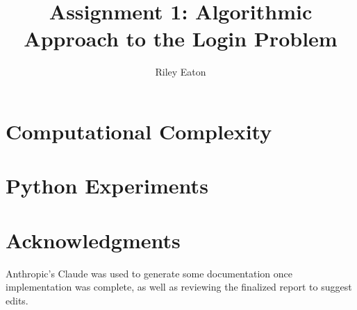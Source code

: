 \documentclass[acmsmall,screen]{acmart}
\title{Assignment 1: Algorithmic Approach to the Login Problem}
\author{Riley Eaton}
\affiliation{%
  \institution{University of British Columbia}
  \city{Kelowna}
  \state{BC}
  \country{Canada}
}
\begin{document}
\fancyfoot{} %

\maketitle

\section{Computational Complexity} \label{sec:complexity}


\section{Python Experiments} \label{sec:experiments}







\section*{Acknowledgments}
Anthropic's Claude was used to generate some documentation once implementation was complete, as well as reviewing the finalized report to suggest edits.
\end{document}
